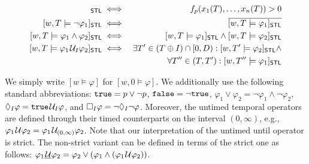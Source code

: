 \small
\begin{align*}
	[w,T \models p]_{\mathsf{STL}} &\iff & f_p(x_1(T), \ldots, x_n(T)) > 0 \\
	[w,T \models \lnot \varphi_1]_{\mathsf{STL}} &\iff & \overline{[w,T \models \varphi_1]_{\mathsf{STL}}} \\
	[w,T \models \varphi_1 \land \varphi_2]_{\mathsf{STL}} &\iff & [w,T \models \varphi_1]_{\mathsf{STL}} \land [w,T \models \varphi_2]_{\mathsf{STL}} \\
	[w,T \models \varphi_1 \until_I \varphi_2]_{\mathsf{STL}} &\iff & \exists T' \in (T \oplus I) \cap [0,D) : [w,T' \models \varphi_2]_{\mathsf{STL}} \land \\
	& & \forall T'' \in (T, T') : [w,T'' \models \varphi_1]_{\mathsf{STL}} \\
\end{align*}
\normalsize

We simply write $[w \models \varphi]$ for $[w,0 \models \varphi]$.
We additionally use the following standard abbreviations: 
$\texttt{true} = p \lor \lnot p$,
$\texttt{false} = \lnot \texttt{true}$,
$ \varphi_1 \lor \varphi_2 = \lnot \varphi_1 \land \lnot \varphi_2$,
$\lozenge_I \varphi = \texttt{true} \kern.1em\mathcal{U}_I \varphi$, and
$\square_I \varphi = \lnot \lozenge_I \lnot \varphi$.
Moreover, the untimed temporal operators are defined through their timed counterparts on the interval $(0,\infty)$, e.g., $\varphi_1 \kern.1em\mathcal{U} \varphi_2 = \varphi_1 \kern.1em\mathcal{U}_{(0,\infty)} \varphi_2$.
Note that our interpretation of the untimed until operator is strict.
The non-strict variant can be defined in terms of the strict one as follows: $\varphi_1 \underline{\kern.1em\mathcal{U}} \varphi_2 = \varphi_2 \lor (\varphi_1 \land (\varphi_1 \kern.1em\mathcal{U} \varphi_2))$.

